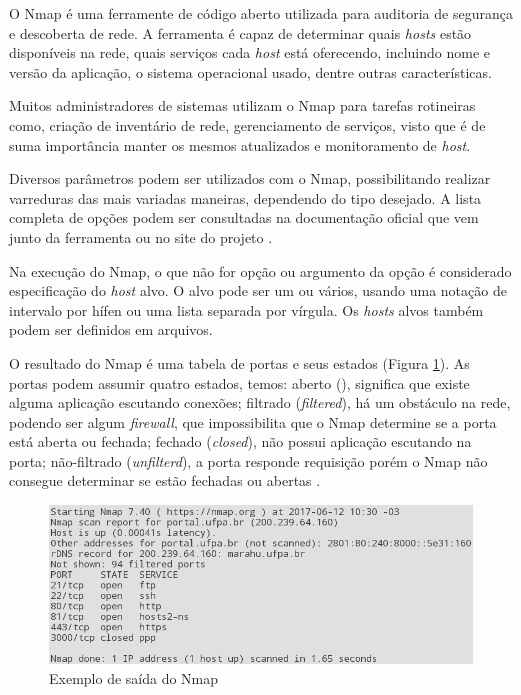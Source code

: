 \documentclass[
	12pt,				
	openright,		
	twoside,	
	a4paper,
	english,	
	brazil	
	]{abntex2}
\begin{document}
O Nmap é uma ferramente de código aberto utilizada para auditoria de segurança e descoberta de rede. A ferramenta é capaz de determinar quais \textit{hosts} estão disponíveis na rede, quais serviços cada \textit{host} está oferecendo, incluindo nome e versão da aplicação, o sistema operacional usado, dentre outras características.  

Muitos administradores de sistemas utilizam o Nmap para tarefas rotineiras como, criação de inventário de rede, gerenciamento de serviços, visto que é de suma importância manter os mesmos atualizados e monitoramento de \textit{host}.

Diversos parâmetros podem ser utilizados com o Nmap, possibilitando realizar varreduras das mais variadas maneiras, dependendo do tipo desejado. A lista completa de opções podem ser consultadas na documentação oficial que vem junto da ferramenta ou no site do projeto \cite{nmap}. 

Na execução do Nmap, o que não for opção ou argumento da opção é considerado especificação do \textit{host} alvo. O alvo pode ser um ou vários, usando uma notação de intervalo por hífen ou uma lista separada por vírgula. Os \textit{hosts} alvos também podem ser definidos em arquivos.

O resultado do Nmap é uma tabela de portas e seus estados (Figura \ref{fig:nmap}). As portas podem assumir quatro estados, temos: aberto (), significa que existe alguma aplicação escutando conexões; filtrado (\textit{filtered}), há um obstáculo na rede, podendo ser algum \textit{firewall}, que impossibilita que o Nmap determine se a porta está aberta ou fechada; fechado (\textit{closed}), não possui aplicação escutando na porta; não-filtrado (\textit{unfilterd}), a porta responde requisição porém o Nmap não consegue determinar se estão fechadas ou abertas \cite{nmap}.

\begin{figure}[!htp]
 \centering
 \includegraphics[scale=.5]{nmap.png}
 \caption{Exemplo de saída do Nmap}
 \label{fig:nmap}
\end{figure}
\end{document}
